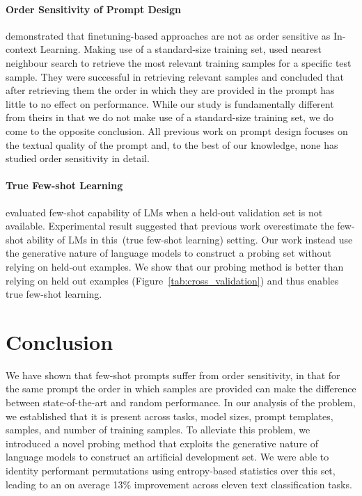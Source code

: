 \paragraph{Order Sensitivity of Prompt Design}
\citet{gao2020making} demonstrated that finetuning-based approaches are not as order sensitive as In-context Learning. Making use of a standard-size training set, \citet{liu2021makes} used nearest neighbour search to retrieve the most relevant training samples for a specific test sample. They were successful in retrieving relevant samples and concluded that after retrieving them the order in which they are provided in the prompt has little to no effect on performance. While our study is fundamentally different from theirs in that we do not make use of a standard-size training set, we do come to the opposite conclusion. All previous work on prompt design focuses on the textual quality of the prompt and, to the best of our knowledge, none has studied order sensitivity in detail.
\paragraph{True Few-shot Learning}
\citet{perez2021true} evaluated few-shot capability of LMs when a held-out validation set is not available. Experimental result suggested that previous work overestimate the few-shot ability of LMs in this~(true few-shot learning) setting. Our work instead use the generative nature of language models to construct a probing set without relying on held-out examples. We show that our probing method is better than relying on held out examples (Figure~\ref{tab:cross_validation}) and thus enables true few-shot learning.

\section{Conclusion}
We have shown that few-shot prompts suffer from order sensitivity, in that for the same prompt the order in which samples are provided can make the difference between state-of-the-art and random performance. In our analysis of the problem, we established that it is present across tasks, model sizes, prompt templates, samples, and number of training samples. To alleviate this problem, we introduced a novel probing method that exploits the generative nature of language models to construct an artificial development set. We were able to identity performant permutations using entropy-based statistics over this set, leading to an on average 13\% improvement across eleven text classification tasks.


